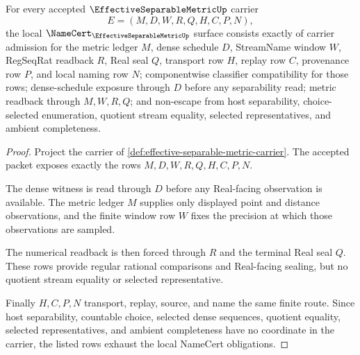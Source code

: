 \begin{theorem}
\label{thm:effective-separable-metric-namecert-obligations}
For every accepted $\EffectiveSeparableMetricUp$ carrier
$$
E=(M,D,W,R,Q,H,C,P,N),
$$
the local $\NameCert_{\EffectiveSeparableMetricUp}$ surface consists exactly of carrier admission for the metric ledger $M$, dense schedule $D$, StreamName window $W$, RegSeqRat readback $R$, Real seal $Q$, transport row $H$, replay row $C$, provenance row $P$, and local naming row $N$; componentwise classifier compatibility for those rows; dense-schedule exposure through $D$ before any separability read; metric readback through $M,W,R,Q$; and non-escape from host separability, choice-selected enumeration, quotient stream equality, selected representatives, and ambient completeness.
\end{theorem}
\begin{proof}
Project the carrier of \autoref{def:effective-separable-metric-carrier}. The accepted packet exposes exactly the rows $M,D,W,R,Q,H,C,P,N$.

The dense witness is read through $D$ before any Real-facing observation is available. The metric ledger $M$ supplies only displayed point and distance observations, and the finite window row $W$ fixes the precision at which those observations are sampled.

The numerical readback is then forced through $R$ and the terminal Real seal $Q$. These rows provide regular rational comparisons and Real-facing sealing, but no quotient stream equality or selected representative.

Finally $H,C,P,N$ transport, replay, source, and name the same finite route. Since host separability, countable choice, selected dense sequences, quotient equality, selected representatives, and ambient completeness have no coordinate in the carrier, the listed rows exhaust the local NameCert obligations.
\end{proof}

